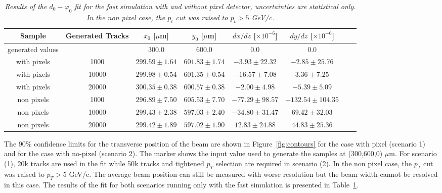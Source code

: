 \documentclass{cmspaper}
\begin{document}
\begin{table} [th]
\caption{\it \label{d0phiresultsNopixel} Results of the $d_0
- \varphi_0$ fit for the fast simulation with and without pixel detector, uncertainties are statistical only.
In the non pixel case, the $p_t$ cut was raised to $p_t>5$ GeV/c.}
\begin{center}
\small
\begin{tabular}{|c|c|c|c|c|c|c|c|} \hline
Sample         & Generated Tracks  & $x_0$ [$\mu$m] & $y_0$ [$\mu$m] & $dx/dz$ [$\times10^{-6}$] & $dy/dz$ [$\times10^{-6}$] \\ \hline\hline
generated values &     & $300.0$ & $600.0$ & $0.0$ & $0.0$ \\ \hline
with pixels    & 1000  & $299.59 \pm 1.64$ & $601.83 \pm 1.74$ & $-3.93 \pm 22.32$ & $-2.85 \pm 25.76$  \\
with pixels    & 10000 & $299.98 \pm 0.54$ & $601.35 \pm 0.54$ & $-16.57 \pm 7.08$ & $3.36 \pm 7.25$  \\
with pixels    & 20000 & $300.35 \pm 0.38$ & $600.57 \pm 0.38$ & $-2.00 \pm 4.98$ & $-5.39 \pm 5.09$  \\ \hline

non pixels     & 1000  & $296.89 \pm 7.50$ & $605.53 \pm 7.70$ & $-77.29 \pm 98.57$ & $-132.54 \pm 104.35$  \\
non pixels     & 10000 & $299.43 \pm 2.38$ & $597.03 \pm 2.40$ & $-34.80 \pm 31.47$ & $69.42 \pm 32.03$ \\
non pixels     & 20000 & $299.42 \pm 1.89$ & $597.02 \pm 1.90$ & $12.83 \pm 24.88$ & $44.83 \pm 25.36$ \\ \hline
\end{tabular}
\end{center}

\end{table} 


The 90\% confidence limits for the transverse position of the beam are shown in 
Figure~\ref{fig:contours} for the case with pixel (scenario 1) and for the case with
no-pixel (scenario 2). The marker shows the input value used to generate the samples at (300,600,0) $\mu$m. For
scenario (1), 20k tracks are used in the fit while 50k tracks and tightened $p_T$ 
selection are required in scenario (2). In the non pixel case, the $p_T$ cut was raised to $p_T>5$ GeV/c. The average beam position can still be measured with
worse resolution but the beam width cannot be resolved in this case. The results of the fit for both
scenarios running only with the fast simulation is presented in Table~\ref{d0phiresultsNopixel}.
\end{document}
